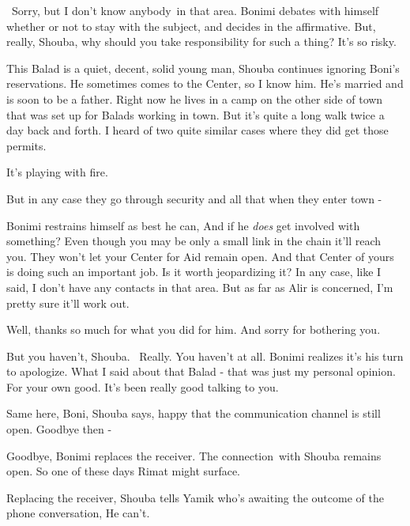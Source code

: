 \documentclass[letterpaper]{article}
\begin{document}
~{\textquotedbl}Sorry, but I don't know anybody~in that area.{\textquotedbl} Bonimi debates with himself whether or not
to stay with the subject, and decides in the affirmative. {\textquotedbl}But, really, Shouba, why should you take
responsibility for such a thing? It's so risky.{\textquotedbl} 

{\textquotedbl}This Balad is a quiet, decent, solid young man,{\textquotedbl} Shouba continues ignoring Boni's
reservations. {\textquotedbl}He sometimes comes to the Center, so I know him. He's married and is soon to be a father.
Right now he lives in a camp on the other side of town that was set up for Balads working in town. But it's quite a
long walk twice a day back and forth. I heard of two quite similar cases where they did get those
permits.{\textquotedbl}

{\textquotedbl}It's playing with fire.{\textquotedbl} 

{\textquotedbl}But in any case they go through security and all that when they enter town -{\textquotedbl}

Bonimi restrains himself as best he can, {\textquotedbl}And if he \textit{does} get involved with something? Even though
you may be only a small link in the chain it'll reach you. They won't let your Center for Aid remain open. And that
Center of yours is doing such an important job. Is it worth jeopardizing it? In any case, like I said, I don't have any
contacts in that area. But as far as Alir is concerned, I'm pretty sure it'll work out.{\textquotedbl} 

{\textquotedbl}Well, thanks so much for what you did for him. And sorry for bothering you.{\textquotedbl} 

{\textquotedbl}But you haven't, Shouba. \ Really. You haven't at all.{\textquotedbl} Bonimi realizes it's his turn to
apologize. {\textquotedbl}What I said about that Balad - that was just my personal opinion. For your own good. It's
been really good\textcolor{red}{ }talking to you.{\textquotedbl} 

{\textquotedbl}Same here, Boni,{\textquotedbl} Shouba says, happy that the communication channel is still open.
{\textquotedbl}Goodbye then -{\textquotedbl} 

{\textquotedbl}Goodbye,{\textquotedbl} Bonimi replaces the receiver. The connection~with Shouba remains open. So one of
these days Rimat might surface. 

Replacing the receiver, Shouba tells Yamik who's awaiting the outcome of the phone conversation, {\textquotedbl}He
can't.{\textquotedbl}
\end{document}
